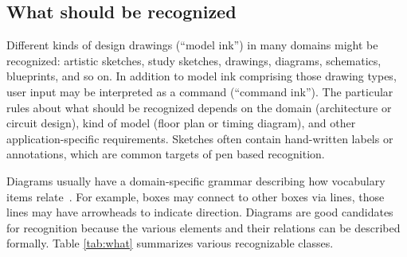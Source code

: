 \subsection{What should be recognized}
\label{sec:recognition-what}

Different kinds of design drawings (``model ink'') in many domains
might be recognized: artistic sketches, study sketches, drawings,
diagrams, schematics, blueprints, and so on. In addition to model ink
comprising those drawing types, user input may be interpreted as a
command (``command ink''). The particular rules about what should be
recognized depends on the domain (architecture or circuit design),
kind of model (floor plan or timing diagram), and other
application-specific requirements. Sketches often contain hand-written
labels or annotations, which are common targets of pen based
recognition.


Diagrams usually have a domain-specific grammar describing how
vocabulary items relate~\cite{lakin-vmacs-89}. For example, boxes may
connect to other boxes via lines, those lines may have arrowheads to
indicate direction. Diagrams are good candidates for recognition
because the various elements and their relations can be described
formally. Table \ref{tab:what} summarizes various recognizable
classes.

